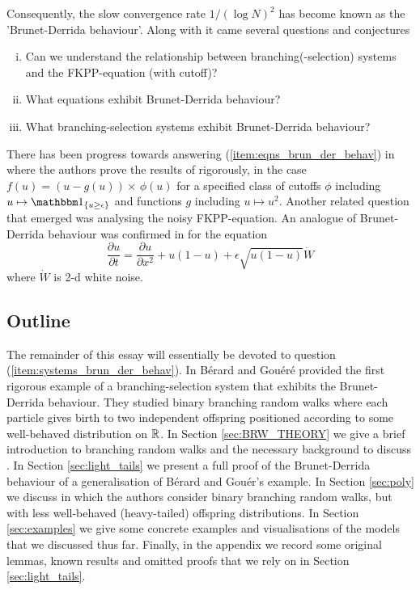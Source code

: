 Consequently, the slow convergence rate $1 / (\log N)^2$ has become known as the 'Brunet-Derrida behaviour'. Along with it came several questions and conjectures
\begin{enumerate}[(i)]
\item \vspace{-2mm}Can we understand the relationship between branching(-selection) systems and the FKPP-equation (with cutoff)? 
\item \vspace{-2mm}What equations exhibit Brunet-Derrida behaviour? \label{item:eqns_brun_der_behav}
\item \vspace{-2mm}What branching-selection systems exhibit Brunet-Derrida behaviour? \label{item:systems_brun_der_behav}
\end{enumerate}{}
There has been progress towards answering (\ref{item:eqns_brun_der_behav}) in \cite{dumortier2007critical} where the authors prove the results of \cite{brunet1997shift} rigorously, in the case $f(u) = (u - g(u)) \times\,\phi(u)$ for a specified class of cutoffs $\phi$ including $u \mapsto \Ind_{\{ u \geq \epsilon\}}$ and functions $g$ including $u \mapsto u^2$. Another related question that emerged was analysing the noisy FKPP-equation. An analogue of Brunet-Derrida behaviour was confirmed in \cite{mueller2011effect} for the equation
\begin{equation}\nonumber
\frac{\partial u}{\partial t} = \frac{\partial u}{\partial x^2} + u(1 - u) + \epsilon \sqrt{u(1 - u)} \dot{W}
\end{equation}
where $\dot{W}$ is 2-d white noise. \\


\subsection{Outline}
The remainder of this essay will essentially be devoted to question (\ref{item:systems_brun_der_behav}). In \cite{exp_tails} Bérard and Gouéré provided the first rigorous example of a branching-selection system that exhibits the Brunet-Derrida behaviour. They studied binary branching random walks where each particle gives birth to two independent offspring positioned according to some well-behaved distribution on $\mathbb{R}$. In Section \ref{sec:BRW_THEORY} we give a brief introduction to branching random walks and the necessary background to discuss \cite{exp_tails}. In Section \ref{sec:light_tails} we present a full proof of the Brunet-Derrida behaviour of a generalisation of Bérard and Gouér's example. In Section \ref{sec:poly} we discuss \cite{poly_tails} in which the authors consider binary branching random walks, but with less well-behaved (heavy-tailed) offspring distributions. In Section \ref{sec:examples} we give some concrete examples and visualisations of the models that we discussed thus far. Finally, in the appendix we record some original lemmas, known results and omitted proofs that we rely on in Section \ref{sec:light_tails}. 

\newpage